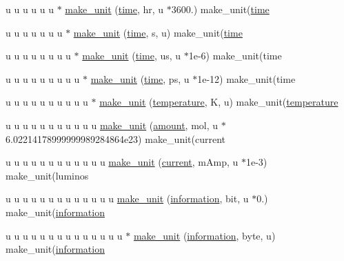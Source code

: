 \begin{DoxyCompactItemize}
\item 
u u u u u u $\ast$ \hyperlink{namespacemui_1_1dim_abe764645bff0d3068e8a00eec2e03243}{make\+\_\+unit} (\hyperlink{namespacemui_1_1dim_a3d3a0014025f1c2c0dd7418791928500}{time}, hr, u $\ast$3600.) make\+\_\+unit(\hyperlink{namespacemui_1_1dim_a3d3a0014025f1c2c0dd7418791928500}{time}
\item 
u u u u u u u $\ast$ \hyperlink{namespacemui_1_1dim_ad0934027ae4940f2dfb316f629c8666f}{make\+\_\+unit} (\hyperlink{namespacemui_1_1dim_a3d3a0014025f1c2c0dd7418791928500}{time}, s, u) make\+\_\+unit(\hyperlink{namespacemui_1_1dim_a3d3a0014025f1c2c0dd7418791928500}{time}
\item 
u u u u u u u u $\ast$ \hyperlink{namespacemui_1_1dim_ab4b29a62c60a57c7d82d4b720b5c60b2}{make\+\_\+unit} (\hyperlink{namespacemui_1_1dim_a3d3a0014025f1c2c0dd7418791928500}{time}, us, u $\ast$1e-\/6) make\+\_\+unit(time
\item 
u u u u u u u u u $\ast$ \hyperlink{namespacemui_1_1dim_ae32f3eb97742ea3c53455e5dfabbfcf6}{make\+\_\+unit} (\hyperlink{namespacemui_1_1dim_a3d3a0014025f1c2c0dd7418791928500}{time}, ps, u $\ast$1e-\/12) make\+\_\+unit(time
\item 
u u u u u u u u u u $\ast$ \hyperlink{namespacemui_1_1dim_ad13049779c3b8b8d6b0835c1c71e6c72}{make\+\_\+unit} (\hyperlink{namespacemui_1_1dim_a3d9b1e07165d3ef9a3d9213035e05d8e}{temperature}, K, u) make\+\_\+unit(\hyperlink{namespacemui_1_1dim_a3d9b1e07165d3ef9a3d9213035e05d8e}{temperature}
\item 
u u u u u u u u u u u \hyperlink{namespacemui_1_1dim_a9c5b0b92a5e28354122e6c161e4cff81}{make\+\_\+unit} (\hyperlink{namespacemui_1_1dim_a00ff3f13d3bd0f4564227904373dc3eb}{amount}, mol, u $\ast$6.\+02214178999999989284864e23) make\+\_\+unit(current
\item 
u u u u u u u u u u u u \hyperlink{namespacemui_1_1dim_af35c9a8a4960413b0b407ce98ff3c20b}{make\+\_\+unit} (\hyperlink{namespacemui_1_1dim_ac15a72100f3e57d6c9419fca5501b456}{current}, m\+Amp, u $\ast$1e-\/3) make\+\_\+unit(luminos
\item 
u u u u u u u u u u u u u \hyperlink{namespacemui_1_1dim_a60f98618196effbc4cfa0a0e6a65878f}{make\+\_\+unit} (\hyperlink{namespacemui_1_1dim_abee516dc27b7ef30e706ffc9ce0ea363}{information}, bit, u $\ast$0.) make\+\_\+unit(\hyperlink{namespacemui_1_1dim_abee516dc27b7ef30e706ffc9ce0ea363}{information}
\item 
u u u u u u u u u u u u u u $\ast$ \hyperlink{namespacemui_1_1dim_ad948fccaa4d4572e517cf2b476c3a76f}{make\+\_\+unit} (\hyperlink{namespacemui_1_1dim_abee516dc27b7ef30e706ffc9ce0ea363}{information}, byte, u) make\+\_\+unit(\hyperlink{namespacemui_1_1dim_abee516dc27b7ef30e706ffc9ce0ea363}{information}

\end{DoxyCompactItemize}
